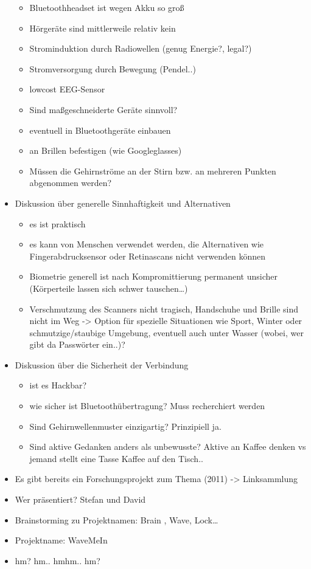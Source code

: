 \begin{itemize}
  \begin{itemize}
  \itemsep1pt\parskip0pt
  \item
    Bluetoothheadset ist wegen Akku so groß
  \item
    Hörgeräte sind mittlerweile relativ kein
  \item
    Strominduktion durch Radiowellen (genug Energie?, legal?)
  \item
    Stromversorgung durch Bewegung (Pendel..)
  \item
    lowcost EEG-Sensor
  \item
    Sind maßgeschneiderte Geräte sinnvoll?
  \item
    eventuell in Bluetoothgeräte einbauen
  \item
    an Brillen befestigen (wie Googleglasses)
  \item
    Müssen die Gehirnströme an der Stirn bzw. an mehreren Punkten
    abgenommen werden?
  \end{itemize}
\item
  Diskussion über generelle Sinnhaftigkeit und Alternativen

  \begin{itemize}
  \itemsep1pt\parskip0pt
  \item
    es ist praktisch
  \item
    es kann von Menschen verwendet werden, die Alternativen wie
    Fingerabdrucksensor oder Retinascans nicht verwenden können
  \item
    Biometrie generell ist nach Kompromittierung permanent unsicher
    (Körperteile lassen sich schwer tauschen\ldots{})
  \item
    Verschmutzung des Scanners nicht tragisch, Handschuhe und Brille
    sind nicht im Weg -\textgreater{} Option für spezielle Situationen
    wie Sport, Winter oder schmutzige/staubige Umgebung, eventuell auch
    unter Wasser (wobei, wer gibt da Passwörter ein..)?
  \end{itemize}
\item
  Diskussion über die Sicherheit der Verbindung

  \begin{itemize}
  \itemsep1pt\parskip0pt
  \item
    ist es Hackbar?
  \item
    wie sicher ist Bluetoothübertragung? Muss recherchiert werden
  \item
    Sind Gehirnwellenmuster einzigartig? Prinzipiell ja.
  \item
    Sind aktive Gedanken anders als unbewusste? Aktive an Kaffee denken
    vs jemand stellt eine Tasse Kaffee auf den Tisch..
  \end{itemize}
\item
  Es gibt bereits ein Forschungsprojekt zum Thema (2011) -\textgreater{}
  Linksammlung
\item
  Wer präsentiert? Stefan und David
\item
  Brainstorming zu Projektnamen: Brain , Wave, Lock\ldots{}
\item
  Projektname: WaveMeIn
\item
  hm? hm.. hmhm.. hm?
\end{itemize}


